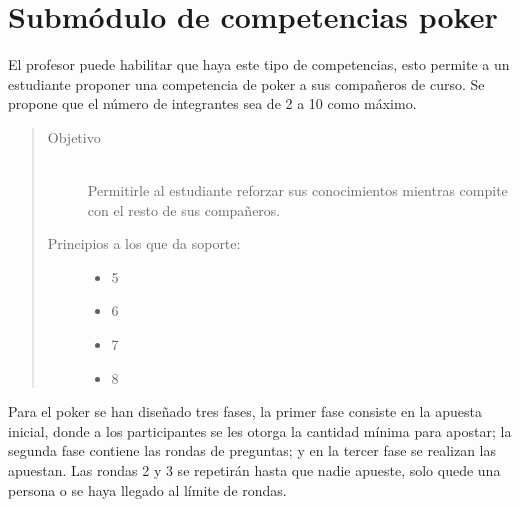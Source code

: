 \section{Submódulo de competencias poker}
    El profesor puede habilitar que haya este tipo de competencias, esto permite a un estudiante proponer una competencia de poker a sus compañeros de curso. Se propone que el número de integrantes sea de 2 a 10 como máximo.

    \begin{quote}
    \begin{description}
    \item[Objetivo] \hfill\\
        Permitirle al estudiante reforzar sus conocimientos mientras compite con el resto de sus compañeros.
    \item[Principios a los que da soporte:] \hfill
        \begin{itemize}
            \item 5 \principioV
            \item 6 \principioVI
            \item 7 \principioVII
            \item 8 \principioVIII
        \end{itemize}
    \end{description}
    \end{quote}

    \noindent Para el poker se han diseñado tres fases, la primer fase consiste en la apuesta inicial, donde a los participantes se les otorga la cantidad mínima para apostar; la segunda fase contiene las rondas de preguntas; y en la tercer fase se realizan las apuestan. Las rondas 2 y 3 se repetirán hasta que nadie apueste, solo quede una persona o se haya llegado al límite de rondas.

